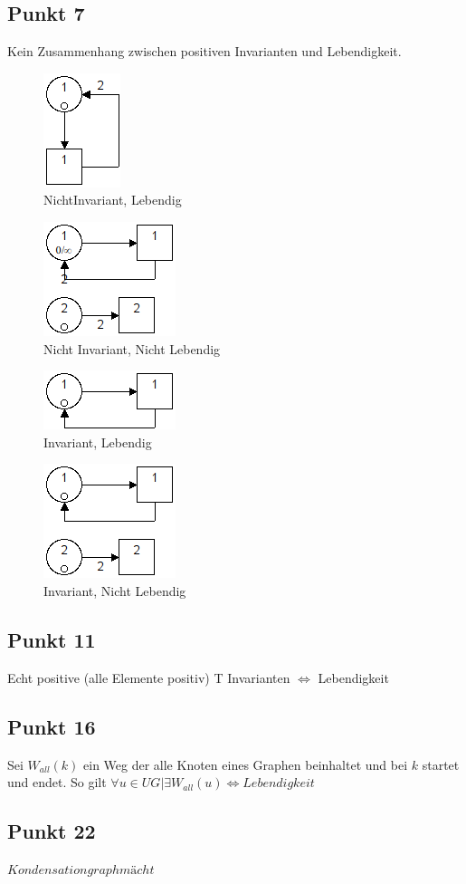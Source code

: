 \documentclass[10pt]{scrartcl}
\begin{document}
		
		\subsection{Punkt 7}
		Kein Zusammenhang zwischen positiven Invarianten und Lebendigkeit.
				\begin{figure}[H]
    				\centering	
					\includegraphics[scale=0.5]{aufg071.png}		
            		\caption{NichtInvariant, Lebendig}
				\end{figure}
				\begin{figure}[H]
    				\centering	
					\includegraphics[scale=0.5]{aufg072.png}		
            		\caption{Nicht Invariant, Nicht Lebendig}
				\end{figure}
				\begin{figure}[H]
    				\centering	
					\includegraphics[scale=0.5]{aufg073.png}		
            		\caption{Invariant, Lebendig}
				\end{figure}
				\begin{figure}[H]
    				\centering	
					\includegraphics[scale=0.5]{aufg074.png}		
            		\caption{Invariant, Nicht Lebendig}
				\end{figure}
				
		\subsection{Punkt 11}
		Echt positive (alle Elemente positiv) T Invarianten $\Longleftrightarrow$ Lebendigkeit
		
		\subsection{Punkt 16}
		Sei $W_{all}(k)$ ein Weg der alle Knoten eines Graphen beinhaltet und bei $k$ startet und endet.
		So gilt $\forall u \in UG | \exists  W_{all}(u) \Longleftrightarrow \textit{Lebendigkeit}$		
		
		\subsection{Punkt 22}
		$Kondensationgraph mächt$	
					
\end{document}
